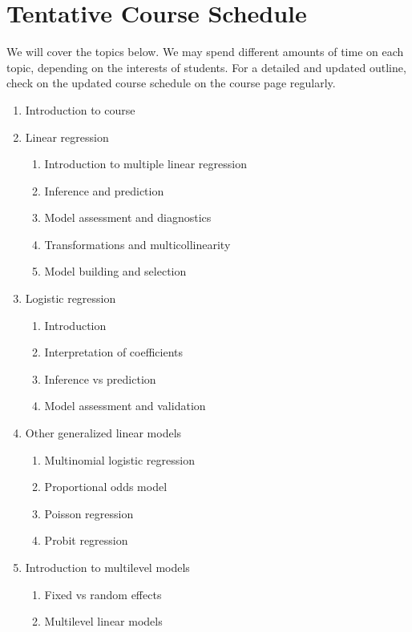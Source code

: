 \documentclass[11pt, a4paper]{article}
\begin{document}
\section{Tentative Course Schedule} 
We will cover the topics below. We may spend different amounts of time on each topic, depending on the interests of students. For a detailed and updated outline, check on the updated course schedule on the course page regularly. 
\begin{enumerate}[label= {\color{darkblue}{\ArrowBoldRightStrobe}}]
	\item Introduction to course %
	\item Linear regression %
	\begin{enumerate}[label= {\color{cyan}{\Rectangle}}]
		\item Introduction to multiple linear regression
		\item Inference and prediction
		\item Model assessment and diagnostics
			\item Transformations and multicollinearity
		\item Model building and selection
	\end{enumerate}
	\item Logistic regression
	\begin{enumerate}[label= {\color{cyan}{\Rectangle}}]
		\item Introduction
		\item Interpretation of coefficients
		\item Inference vs prediction
		\item Model assessment and validation
	\end{enumerate}
	\item Other generalized linear models
	\begin{enumerate}[label= {\color{cyan}{\Rectangle}}]
		\item Multinomial logistic regression
		\item Proportional odds model
		\item Poisson regression
		\item Probit regression
	\end{enumerate}
	\item Introduction to multilevel models
	\begin{enumerate}[label= {\color{cyan}{\Rectangle}}]
		\item Fixed vs random effects
		\item Multilevel linear models

\end{enumerate}
\end{enumerate}
\end{document}
